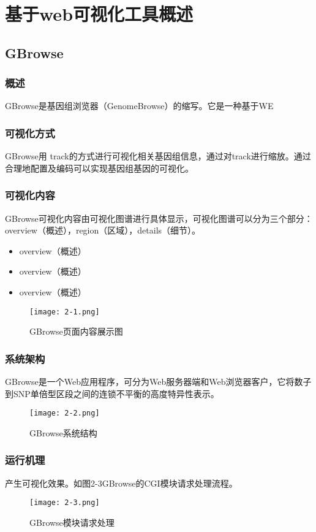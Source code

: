 \chapter{基于web可视化工具概述}
	\section{GBrowse}
		\subsection{概述}
		GBrowse是基因组浏览器（GenomeBrowse）的缩写。它是一种基于WE
		\subsection{可视化方式}
		GBrowse用 track的方式进行可视化相关基因组信息，通过对track进行缩放。通过合理地配置及编码可以实现基因组基因的可视化。
	
		\subsection{可视化内容}
		GBrowse可视化内容由可视化图谱进行具体显示，可视化图谱可以分为三个部分：overview（概述），region（区域），details（细节）。
		\begin{itemize}
			\item overview（概述）
			\item overview（概述）
			\item overview（概述）
		\end{itemize}

		\begin{figure}
			\centering
			\texttt{[image: 2-1.png]}
			\caption{GBrowse页面内容展示图}
		\end{figure}	
		\subsection{系统架构}
		GBrowse是一个Web应用程序，可分为Web服务器端和Web浏览器客户，它将数子到SNP单倍型区段之间的连锁不平衡的高度特异性表示。
		\begin{figure}[!ht]
			\centering
			\texttt{[image: 2-2.png]}
			\caption{GBrowse系统结构}
		\end{figure}
		\subsection{运行机理}
产生可视化效果。如图2-3GBrowse的CGI模块请求处理流程。
			\begin{figure}[!ht]
				\centering
				\texttt{[image: 2-3.png]}
				\caption{GBrowse模块请求处理}
			\end{figure}
